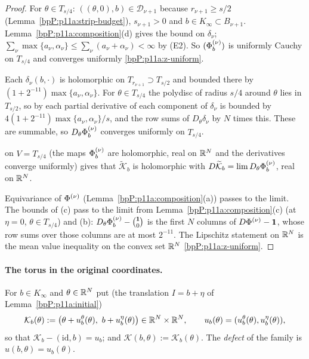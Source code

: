 \begin{proof}
\label{stepP:p11a:lm-inc} For $\theta\in T_{s/4}$: $((\theta,0),b)\in\mathcal D_{\nu+1}$ because $r_{\nu+1}\ge s/2$ (Lemma~\ref{bpP:p11a:strip-budget}), $s_{\nu+1}>0$ and $b\in K_\infty\subset B_{\nu+1}$. Lemma~\ref{bpP:p11a:composition}(d) gives the bound on $\delta_\nu$; $\sum_\nu\max\{a_\nu,\alpha_\nu\}\le\sum_\nu(a_\nu+\alpha_\nu)<\infty$ by (E2). So $(\Phi^{(\nu)}_b)$ is uniformly Cauchy on $T_{s/4}$ and converges uniformly \ref{bpP:p11a:z-uniform}.

\label{stepP:p11a:lm-der} Each $\delta_\nu(b,\cdot)$ is holomorphic on $T_{r_{\nu+1}}\supset T_{s/2}$ and bounded there by $(1+2^{-11})\max\{a_\nu,\alpha_\nu\}$. For $\theta\in T_{s/4}$ the polydisc of radius $s/4$ around $\theta$ lies in $T_{s/2}$, so by  each partial derivative of each component of $\delta_\nu$ is bounded by $4(1+2^{-11})\max\{a_\nu,\alpha_\nu\}/s$, and the row sums of $D_\theta\delta_\nu$ by $N$ times this. These are summable, so $D_\theta\Phi^{(\nu)}_b$ converges uniformly on $T_{s/4}$.

\label{stepP:p11a:lm-hol}  on $V=T_{s/4}$ (the maps $\Phi^{(\nu)}_b$ are holomorphic, real on $\mathbb{R}^N$ and the derivatives converge uniformly) gives that $\widetilde{\mathcal K}_b$ is holomorphic with $D\widetilde{\mathcal K}_b=\lim D_\theta\Phi^{(\nu)}_b$, real on $\mathbb{R}^N$.

\label{stepP:p11a:lm-bounds} Equivariance of $\Phi^{(\nu)}$ (Lemma~\ref{bpP:p11a:composition}(a)) passes to the limit. The bounds of (c) pass to the limit from Lemma~\ref{bpP:p11a:composition}(c) (at $\eta=0$, $\theta\in T_{s/4}$) and (b): $D_\theta\Phi^{(\nu)}_b-\binom{\mathbf 1}{0}$ is the first $N$ columns of $D\Phi^{(\nu)}-\mathbf 1$, whose row sums over those columns are at most $2^{-11}$. The Lipschitz statement on $\mathbb{R}^N$ is the mean value inequality on the convex set $\mathbb{R}^N$ \ref{bpP:p11a:z-uniform}.
\end{proof}

\paragraph{The torus in the original coordinates.} For $b\in K_\infty$ and $\theta\in\mathbb{R}^N$ put (the translation $I=b+\eta$ of Lemma~\ref{bpP:p11a:initial})
\[\mathcal K_b(\theta):=\bigl(\theta+u^\theta_b(\theta),\ b+u^\eta_b(\theta)\bigr)\in\R^N\times\R^N,\qquad u_b(\theta)=(u^\theta_b(\theta),u^\eta_b(\theta)),\]
so that $\mathcal K_b-(\mathrm{id},b)=u_b$; and $\mathcal K(b,\theta):=\mathcal K_b(\theta)$. The \emph{defect} of the family is $u(b,\theta)=u_b(\theta)$.

